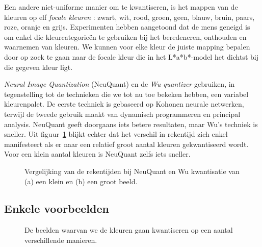 Een andere niet-uniforme manier om te kwantiseren, is het mappen van de kleuren op elf 
\emph{focale kleuren} \cite{van_den_broek:human_color_categorization_for_cbir}: zwart, wit, rood, groen, geen, blauw, bruin, paars, roze, oranje en grijs.
Experimenten hebben aangetoond dat de mens geneigd is om enkel die kleurcategorie\"en te gebruiken bij 
het beredeneren, onthouden en waarnemen van kleuren. We kunnen voor elke kleur de juiste mapping bepalen
door op zoek te gaan naar de focale kleur die in het L*a*b*-model het dichtst bij die gegeven kleur ligt.

\emph{Neural Image Quantization} (NeuQuant) \cite{dekker:neuquant} en de \emph{Wu quantizer} 
\cite{wu:color_quantization_by_dynamic_programming_and_principal_analysis} 
gebruiken, in tegenstelling tot de technieken die we 
tot nu toe bekeken hebben, een variabel kleurenpalet. De eerste techniek is gebaseerd op
Kohonen neurale netwerken, terwijl de tweede gebruik maakt van dynamisch programmeren
en principal analysis. NeuQuant geeft doorgaans iets betere resultaten, maar Wu's techniek is
sneller. Uit figuur~\ref{fig:nuequant_vs_wu} blijkt echter dat het verschil in rekentijd zich
enkel manifesteert als er naar een relatief groot aantal kleuren gekwantiseerd wordt. Voor een
klein aantal kleuren is NeuQuant zelfs iets sneller.

\begin{figure}[tbp]
\begin{center}
\caption{\label{fig:nuequant_vs_wu}Vergelijking van de rekentijden bij NeuQuant en Wu kwantisatie van (a) een klein en (b) een groot beeld.}
\end{center}
\end{figure}

\subsection{Enkele voorbeelden}

\begin{figure}[tbp]
\begin{center}
\caption{\label{fig:kwantistatie_originelen}De beelden waarvan we de kleuren gaan kwantiseren op een aantal verschillende manieren.}
\end{center}
\end{figure}

